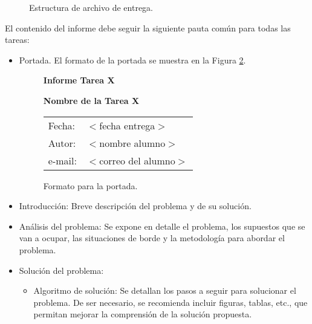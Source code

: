 \documentclass[11pt]{utalcaDoc}
\begin{document}
\begin{figure}
\caption{Estructura de archivo de entrega.}
\label{fig_estructura}
\end{figure}
     

El contenido del informe debe seguir la siguiente pauta común para todas las tareas: 

\begin{itemize}
\item
Portada. El formato de la portada se muestra en la Figura \ref{fig1}.

\begin{figure}[tbp]
%
%
%

\vspace{1cm}

\centerline{\huge \bf Informe Tarea X}
\vspace{0.8cm}
\centerline{\Large \bf Nombre de la Tarea X}

\vspace{2cm}

\hfill \begin{tabular}{ll}
Fecha:  & $<$fecha entrega$>$\\
Autor:  & $<$nombre alumno$>$\\
e-mail: & $<$correo del alumno$>$
\end{tabular}
\caption{Formato para la portada.}
\label{fig1}
\end{figure}

\item Introducción: Breve descripción del problema y de su solución.

\item Análisis del problema: Se expone en detalle el problema, los supuestos
que se van a ocupar, las situaciones de borde y la metodología
para abordar el problema.

\item Solución del problema:
  \begin{itemize}
  \item Algoritmo de solución: Se detallan los pasos a seguir para solucionar
  el problema. De ser necesario, se recomienda incluir figuras, tablas, etc.,
  que permitan mejorar la comprensión de la solución propuesta.
  

\end{itemize}
\end{itemize}
\end{document}
